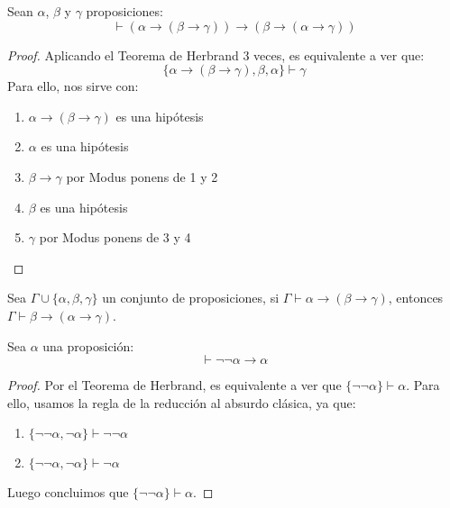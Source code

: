 \begin{prop}
    Sean $\alpha$, $\beta$ y $\gamma$ proposiciones:
    \begin{equation*}
        \vdash (\alpha\to(\beta\to\gamma))\to(\beta\to(\alpha\to\gamma))
    \end{equation*}
    \begin{proof}
        Aplicando el Teorema de Herbrand 3 veces, es equivalente a ver que:
        \begin{equation*}
            \{\alpha\to(\beta\to\gamma),\beta,\alpha\}\vdash \gamma
        \end{equation*}
        Para ello, nos sirve con:
        \begin{enumerate}
            \item $\alpha\to(\beta\to\gamma)$ es una hipótesis
            \item $\alpha$ es una hipótesis
            \item $\beta\to \gamma$ por Modus ponens de 1 y 2
            \item $\beta$ es una hipótesis
            \item $\gamma$ por Modus ponens de 3 y 4
        \end{enumerate}
    \end{proof}
\end{prop}

\begin{coro}
    Sea $\Gamma\cup\{\alpha,\beta,\gamma\}$ un conjunto de proposiciones, si $\Gamma\vdash \alpha\to(\beta\to\gamma)$, entonces $\Gamma\vdash \beta\to(\alpha\to\gamma)$.
\end{coro}

\begin{prop}
    Sea $\alpha$ una proposición:
    \begin{equation*}
        \vdash \lnot\lnot\alpha\to \alpha
    \end{equation*}
    \begin{proof}
        Por el Teorema de Herbrand, es equivalente a ver que $\{\lnot\lnot\alpha\}\vdash \alpha$. Para ello, usamos la regla de la reducción al absurdo clásica, ya que:
        \begin{enumerate}
            \item $\{\lnot\lnot\alpha,\lnot\alpha\}\vdash \lnot\lnot\alpha$
            \item $\{\lnot\lnot\alpha,\lnot\alpha\}\vdash \lnot\alpha$
        \end{enumerate}
        Luego concluimos que $\{\lnot\lnot\alpha\}\vdash \alpha$.
    \end{proof}
\end{prop}

